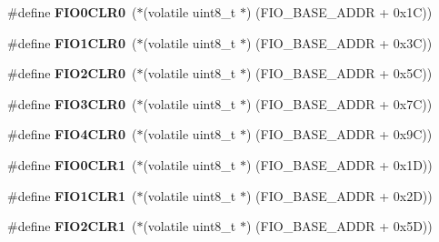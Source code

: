 \begin{DoxyCompactItemize}
\mbox{\label{group__lpc24xx__regs_ga8e5a3e053cf6f429163e4a686c39ef38}} 
\#define {\bfseries F\+I\+O0\+C\+L\+R0}~($\ast$(volatile uint8\+\_\+t $\ast$) (F\+I\+O\+\_\+\+B\+A\+S\+E\+\_\+\+A\+D\+DR + 0x1\+C))
\item 
\mbox{\label{group__lpc24xx__regs_ga55e55a2be93af5b11321cabe30a381b7}} 
\#define {\bfseries F\+I\+O1\+C\+L\+R0}~($\ast$(volatile uint8\+\_\+t $\ast$) (F\+I\+O\+\_\+\+B\+A\+S\+E\+\_\+\+A\+D\+DR + 0x3\+C))
\item 
\mbox{\label{group__lpc24xx__regs_ga83bf7bd4995713a22faccfc68a0ca6ec}} 
\#define {\bfseries F\+I\+O2\+C\+L\+R0}~($\ast$(volatile uint8\+\_\+t $\ast$) (F\+I\+O\+\_\+\+B\+A\+S\+E\+\_\+\+A\+D\+DR + 0x5\+C))
\item 
\mbox{\label{group__lpc24xx__regs_ga354af6b5289fe44eebe7504af0299bda}} 
\#define {\bfseries F\+I\+O3\+C\+L\+R0}~($\ast$(volatile uint8\+\_\+t $\ast$) (F\+I\+O\+\_\+\+B\+A\+S\+E\+\_\+\+A\+D\+DR + 0x7\+C))
\item 
\mbox{\label{group__lpc24xx__regs_gaeff7f43c2485b9d6e0e3a8fd32757683}} 
\#define {\bfseries F\+I\+O4\+C\+L\+R0}~($\ast$(volatile uint8\+\_\+t $\ast$) (F\+I\+O\+\_\+\+B\+A\+S\+E\+\_\+\+A\+D\+DR + 0x9\+C))
\item 
\mbox{\label{group__lpc24xx__regs_gaadcb3254afec1ba262a4c248858b34a6}} 
\#define {\bfseries F\+I\+O0\+C\+L\+R1}~($\ast$(volatile uint8\+\_\+t $\ast$) (F\+I\+O\+\_\+\+B\+A\+S\+E\+\_\+\+A\+D\+DR + 0x1\+D))
\item 
\mbox{\label{group__lpc24xx__regs_gafb74195a3c53c3674d394d510efb689e}} 
\#define {\bfseries F\+I\+O1\+C\+L\+R1}~($\ast$(volatile uint8\+\_\+t $\ast$) (F\+I\+O\+\_\+\+B\+A\+S\+E\+\_\+\+A\+D\+DR + 0x2\+D))
\item 
\mbox{\label{group__lpc24xx__regs_ga2bc6a545f5e1616207c7ea610e938998}} 
\#define {\bfseries F\+I\+O2\+C\+L\+R1}~($\ast$(volatile uint8\+\_\+t $\ast$) (F\+I\+O\+\_\+\+B\+A\+S\+E\+\_\+\+A\+D\+DR + 0x5\+D))
\item 
\mbox{\label{group__lpc24xx__regs_ga9ccc3b12b3c0ba26a63c6ebc75757021}} 

\end{DoxyCompactItemize}
